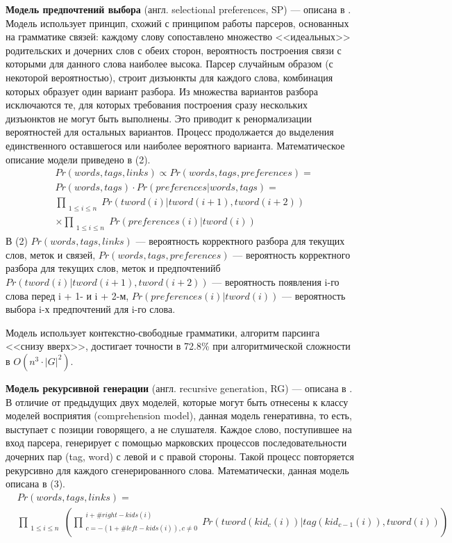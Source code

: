 \textbf{Модель предпочтений выбора} (англ. selectional preferences, SP) --- описана в \cite{eisner}. Модель использует принцип, схожий с принципом работы парсеров, основанных на грамматике связей: каждому слову сопоставлено множество <<идеальных>> родительских и дочерних слов с обеих сторон, вероятность построения связи с которыми для данного слова наиболее высока. Парсер случайным образом (с некоторой вероятностью), строит дизъюнкты для каждого слова, комбинация которых образует один вариант разбора. Из множества вариантов разбора исключаются те, для которых требования построения сразу нескольких дизъюнктов не могут быть выполнены. Это приводит к ренормализации вероятностей для остальных вариантов. Процесс продолжается до выделения единственного оставшегося или наиболее вероятного варианта. Математическое описание модели приведено в (2).
\begin{equation}\begin{split}
	& Pr(words, tags, links) \propto Pr(words, tags, preferences) = \\
	& Pr(words, tags) \cdot Pr(preferences | words, tags) = \\
	& \prod_{\substack{1 \leq i \leq n}} Pr(tword(i) | tword(i + 1), tword(i + 2)) \\
	& \times \prod_{\substack{1 \leq i \leq n}} Pr(preferences(i) | tword(i))
\end{split}\end{equation}
В (2) \(Pr(words, tags, links)\) --- вероятность корректного разбора для текущих слов, меток и связей, \(Pr(words, tags, preferences)\) --- вероятность корректного разбора для текущих слов, меток и предпочтенийб \(Pr(tword(i) | tword(i + 1), tword(i + 2))\) --- вероятность появления i-го слова перед i + 1- и i + 2-м, \(Pr(preferences(i) | tword(i))\) --- вероятность выбора i-х предпочтений для i-го слова.

Модель использует контекстно-свободные грамматики, алгоритм парсинга <<снизу вверх>>, достигает точности в 72.8\% при алгоритмической сложности в \(O(n^3 \cdot |G|^2)\).

\textbf{Модель рекурсивной генерации} (англ. recursive generation, RG) --- описана в \cite{eisner}. В отличие от предыдущих двух моделей, которые могут быть отнесены к классу моделей восприятия (comprehension model), данная модель генеративна, то есть, выступает с позиции говорящего, а не слушателя. Каждое слово, поступившее на вход парсера, генерирует с помощью марковских процессов последовательности дочерних пар (tag, word) с левой и с правой стороны. Такой процесс повторяется рекурсивно для каждого сгенерированного слова. Математически, данная модель описана в (3).
\begin{equation}\begin{split}
	& Pr(words, tags, links) = \\
	& \prod_{\substack{1 \leq i \leq n}} \left( \prod^{\substack{i + \#right-kids(i)}}_{\substack{c = - (1 + \#left-kids(i)), c \neq 0}} Pr(tword(kid_c(i)) | tag(kid_{c - 1}(i)), tword(i)) \right)
\end{split}\end{equation}

